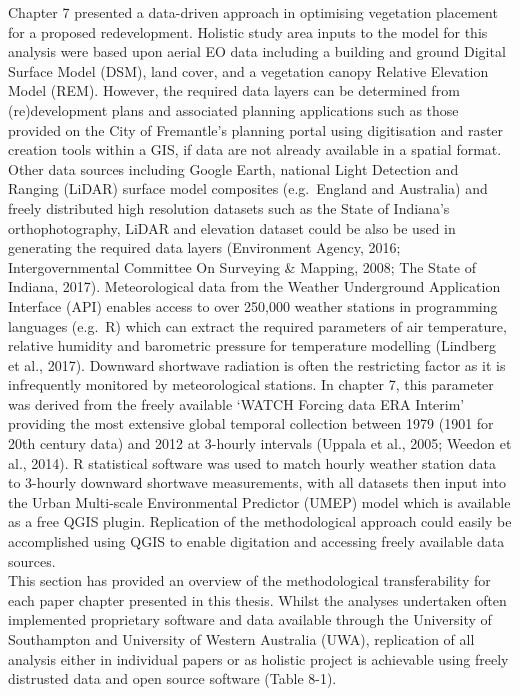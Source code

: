 \documentclass[]{book}
\begin{document}
Chapter 7 presented a data-driven approach in optimising vegetation
placement for a proposed redevelopment. Holistic study area inputs to
the model for this analysis were based upon aerial EO data including a
building and ground Digital Surface Model (DSM), land cover, and a
vegetation canopy Relative Elevation Model (REM). However, the required
data layers can be determined from (re)development plans and associated
planning applications such as those provided on the City of Fremantle's
planning portal using digitisation and raster creation tools within a
GIS, if data are not already available in a spatial format. Other data
sources including Google Earth, national Light Detection and Ranging
(LiDAR) surface model composites (e.g.~England and Australia) and freely
distributed high resolution datasets such as the State of Indiana's
orthophotography, LiDAR and elevation dataset could be also be used in
generating the required data layers (Environment Agency, 2016;
Intergovernmental Committee On Surveying \& Mapping, 2008; The State of
Indiana, 2017). Meteorological data from the Weather Underground
Application Interface (API) enables access to over 250,000 weather
stations in programming languages (e.g.~R) which can extract the
required parameters of air temperature, relative humidity and barometric
pressure for temperature modelling (Lindberg et al., 2017). Downward
shortwave radiation is often the restricting factor as it is
infrequently monitored by meteorological stations. In chapter 7, this
parameter was derived from the freely available `WATCH Forcing data ERA
Interim' providing the most extensive global temporal collection between
1979 (1901 for 20th century data) and 2012 at 3-hourly intervals (Uppala
et al., 2005; Weedon et al., 2014). R statistical software was used to
match hourly weather station data to 3-hourly downward shortwave
measurements, with all datasets then input into the Urban Multi-scale
Environmental Predictor (UMEP) model which is available as a free QGIS
plugin. Replication of the methodological approach could easily be
accomplished using QGIS to enable digitation and accessing freely
available data sources.\\
This section has provided an overview of the methodological
transferability for each paper chapter presented in this thesis. Whilst
the analyses undertaken often implemented proprietary software and data
available through the University of Southampton and University of
Western Australia (UWA), replication of all analysis either in
individual papers or as holistic project is achievable using freely
distrusted data and open source software (Table 8-1).
\end{document}
